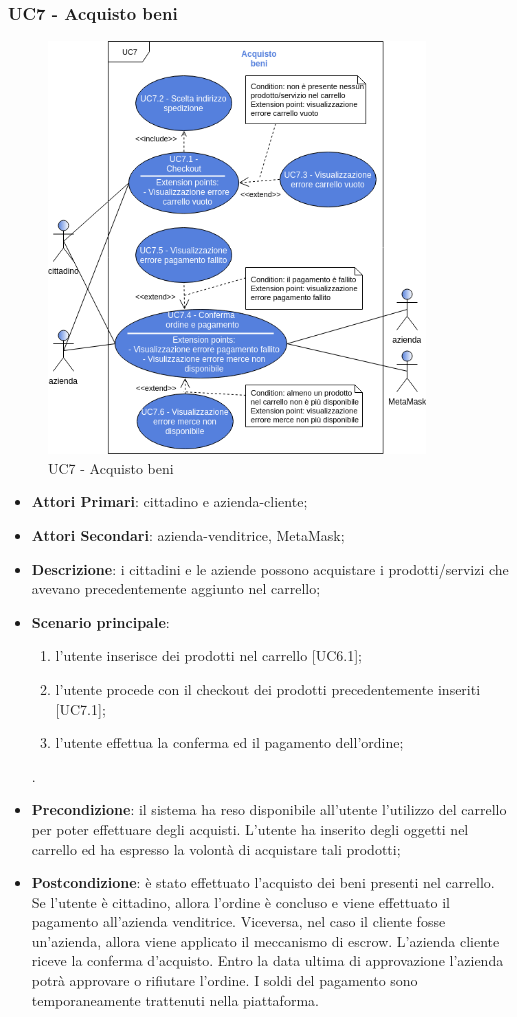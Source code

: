 \subsubsection{UC7 - Acquisto beni}
\begin{figure}[h]
	\includegraphics[width=10cm]{res/images/UC7-Generale.png}
	\centering
	\caption{UC7 - Acquisto beni}
\end{figure}
\begin{itemize}
	\item \textbf{Attori Primari}: cittadino e azienda-cliente;
	\item \textbf{Attori Secondari}: azienda-venditrice, MetaMask\glo;
	\item \textbf{Descrizione}: i cittadini e le aziende possono acquistare i prodotti/servizi che avevano precedentemente aggiunto nel carrello;
	\item \textbf{Scenario principale}: 
	\begin{enumerate}[label=\alph*.]
		\item l'utente inserisce dei prodotti nel carrello [UC6.1];
		\item l'utente procede con il checkout dei prodotti precedentemente inseriti [UC7.1];
		\item l'utente effettua la conferma ed il pagamento dell'ordine;
	\end{enumerate}.
	
	\item \textbf{Precondizione}: il sistema ha reso disponibile all'utente l'utilizzo del carrello per poter effettuare degli acquisti. L'utente ha inserito degli oggetti nel carrello ed ha espresso la volontà di acquistare tali prodotti;
	\item \textbf{Postcondizione}: è stato effettuato l'acquisto dei beni presenti nel carrello. Se l'utente è cittadino, allora l'ordine è concluso e viene effettuato il pagamento all'azienda venditrice. Viceversa, nel caso il cliente fosse un'azienda, allora viene applicato il meccanismo di escrow\glo. L'azienda cliente riceve la conferma d'acquisto\glo. Entro la data ultima di approvazione l'azienda potrà approvare o rifiutare l'ordine. I soldi del pagamento sono temporaneamente trattenuti nella piattaforma.
\end{itemize} 
